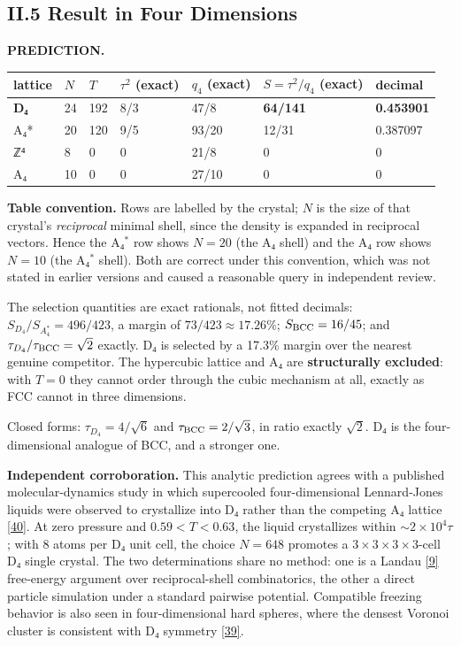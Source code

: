\documentclass[a4paper,11pt]{article}
\begin{document}
\subsection*{II.5 Result in Four Dimensions}

\textbf{PREDICTION.}

\begin{center}
\begin{tabular}{lllllll}
\hline
lattice & $N$ & $T$ & $\tau^2$ (exact) & $q_4$ (exact) & $S=\tau^2/q_4$ (exact) & decimal \\
\hline
\textbf{D₄} & 24 & 192 & 8/3 & 47/8 & \textbf{64/141} & \textbf{0.453901} \\
A₄* & 20 & 120 & 9/5 & 93/20 & 12/31 & 0.387097 \\
ℤ⁴ & 8 & 0 & 0 & 21/8 & 0 & 0 \\
A₄ & 10 & 0 & 0 & 27/10 & 0 & 0 \\
\hline
\end{tabular}
\end{center}

\textbf{Table convention.} Rows are labelled by the crystal; $N$ is the size of that crystal's \textit{reciprocal} minimal shell, since the density is expanded in reciprocal vectors. Hence the A₄$^*$ row shows $N=20$ (the A₄ shell) and the A₄ row shows $N=10$ (the A₄$^*$ shell). Both are correct under this convention, which was not stated in earlier versions and caused a reasonable query in independent review.

The selection quantities are exact rationals, not fitted decimals: $S_{D_4}/S_{A_4^*}=496/423$, a margin of $73/423\approx17.26\%$; $S_{\rm BCC}=16/45$; and $\tau_{D_4}/\tau_{\rm BCC}=\sqrt2$ exactly. D₄ is selected by a 17.3\% margin over the nearest genuine competitor. The hypercubic lattice and A₄ are \textbf{structurally excluded}: with $T=0$ they cannot order through the cubic mechanism at all, exactly as FCC cannot in three dimensions.

Closed forms: $\tau_{D_4}=4/\sqrt6$ and $\tau_{\rm BCC}=2/\sqrt3$, in ratio exactly $\sqrt2$. D₄ is the four-dimensional analogue of BCC, and a stronger one.

\textbf{Independent corroboration.} This analytic prediction agrees with a published molecular-dynamics study in which supercooled four-dimensional Lennard-Jones liquids were observed to crystallize into D₄ rather than the competing A₄ lattice \hyperref[ref40]{[40]}. At zero pressure and $0.59<T<0.63$, the liquid crystallizes within ${\sim}2\times10^4\tau$; with 8 atoms per D₄ unit cell, the choice $N=648$ promotes a $3\times3\times3\times3$-cell D₄ single crystal. The two determinations share no method: one is a Landau \hyperref[ref9]{[9]} free-energy argument over reciprocal-shell combinatorics, the other a direct particle simulation under a standard pairwise potential. Compatible freezing behavior is also seen in four-dimensional hard spheres, where the densest Voronoi cluster is consistent with D₄ symmetry \hyperref[ref39]{[39]}.
\end{document}
